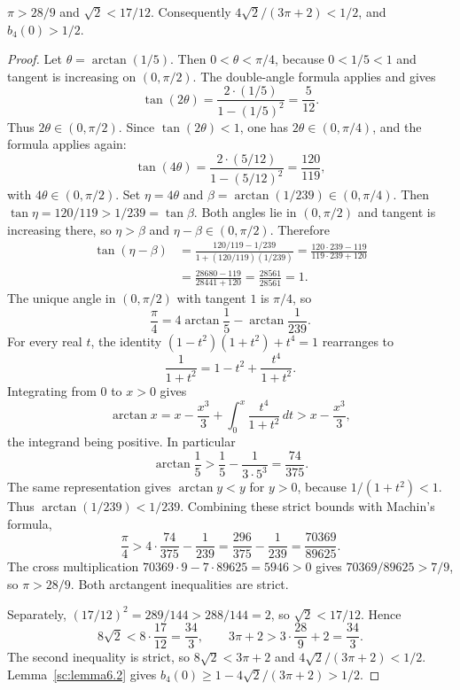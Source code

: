 \begin{lemma}\label{sc:lemma6.3}
\(\pi>28/9\) and \(\sqrt 2<17/12\). Consequently \(4\sqrt 2/(3\pi+2)<1/2\), and \(b_4(0)>1/2\).

\end{lemma}
\begin{proof}
Let \(\theta=\arctan(1/5)\). Then \(0<\theta<\pi/4\), because \(0<1/5<1\) and tangent is increasing on \((0,\pi/2)\). The double-angle formula applies and gives
\[
\tan(2\theta)=\frac{2\cdot(1/5)}{1-(1/5)^2}=\frac{5}{12}.
\]
Thus \(2\theta\in(0,\pi/2)\). Since \(\tan(2\theta)<1\), one has \(2\theta\in(0,\pi/4)\), and the formula applies again:
\[
\tan(4\theta)=\frac{2\cdot(5/12)}{1-(5/12)^2}=\frac{120}{119},
\]
with \(4\theta\in(0,\pi/2)\). Set \(\eta=4\theta\) and \(\beta=\arctan(1/239)\in(0,\pi/4)\). Then \(\tan\eta=120/119>1/239=\tan\beta\). Both angles lie in \((0,\pi/2)\) and tangent is increasing there, so \(\eta>\beta\) and \(\eta-\beta\in(0,\pi/2)\). Therefore
\begin{align*}
\tan(\eta-\beta)
&=\frac{120/119-1/239}{1+(120/119)(1/239)}
=\frac{120\cdot 239-119}{119\cdot 239+120}\\
&=\frac{28680-119}{28441+120}
=\frac{28561}{28561}=1.
\end{align*}
The unique angle in \((0,\pi/2)\) with tangent \(1\) is \(\pi/4\), so
\[
\frac\pi 4=4\arctan\frac15-\arctan\frac1{239}.
\]
For every real \(t\), the identity \((1-t^2)(1+t^2)+t^4=1\) rearranges to
\[
\frac{1}{1+t^2}=1-t^2+\frac{t^4}{1+t^2}.
\]
Integrating from \(0\) to \(x>0\) gives
\[
\arctan x=x-\frac{x^3}{3}+\int_0^x\frac{t^4}{1+t^2}\,dt>x-\frac{x^3}{3},
\]
the integrand being positive. In particular
\[
\arctan\frac15>\frac15-\frac{1}{3\cdot 5^3}=\frac{74}{375}.
\]
The same representation gives \(\arctan y<y\) for \(y>0\), because \(1/(1+t^2)<1\). Thus \(\arctan(1/239)<1/239\). Combining these strict bounds with Machin's formula,
\[
\frac\pi 4>4\cdot\frac{74}{375}-\frac{1}{239}=\frac{296}{375}-\frac{1}{239}=\frac{70369}{89625}.
\]
The cross multiplication \(70369\cdot 9-7\cdot 89625=5946>0\) gives \(70369/89625>7/9\), so \(\pi>28/9\). Both arctangent inequalities are strict.

Separately, \((17/12)^2=289/144>288/144=2\), so \(\sqrt 2<17/12\). Hence
\[
8\sqrt 2<8\cdot\frac{17}{12}=\frac{34}{3},\qquad 3\pi+2>3\cdot\frac{28}{9}+2=\frac{34}{3}.
\]
The second inequality is strict, so \(8\sqrt 2<3\pi+2\) and \(4\sqrt 2/(3\pi+2)<1/2\). Lemma~\ref{sc:lemma6.2} gives \(b_4(0)\ge 1-4\sqrt 2/(3\pi+2)>1/2\).

\end{proof}

